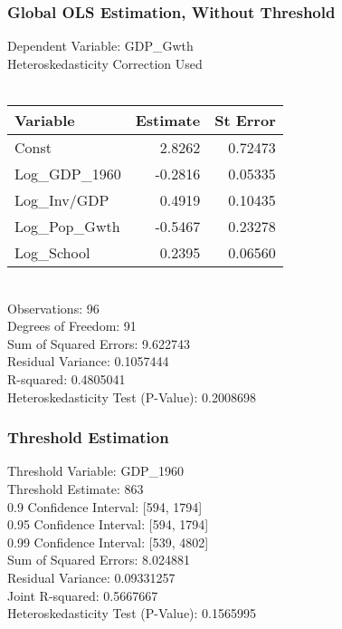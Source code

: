 \subsubsection{Global OLS Estimation, Without Threshold} 
Dependent Variable:      GDP\_Gwth \\
Heteroskedasticity Correction Used \\\\
\begin{tabular}{l*{2}{r}}
\toprule
Variable    &   Estimate     &   St Error \\
\midrule 
Const   &    2.8262   &   0.72473 \\
Log\_GDP\_1960   &   -0.2816   &   0.05335 \\
Log\_Inv/GDP   &    0.4919   &   0.10435 \\
Log\_Pop\_Gwth   &   -0.5467   &   0.23278 \\
Log\_School   &    0.2395   &   0.06560 \\
\bottomrule
\end{tabular}
\bigskip \\
Observations:                       96 \\
Degrees of Freedom:                 91 \\
Sum of Squared Errors:              9.622743 \\
Residual Variance:                  0.1057444 \\
R-squared:                          0.4805041 \\
Heteroskedasticity Test (P-Value):  0.2008698 \\

\subsubsection{Threshold Estimation} 
Threshold Variable:                 GDP\_1960 \\
Threshold Estimate:                 863 \\
0.9 Confidence Interval:           [594, 1794] \\
0.95 Confidence Interval:           [594, 1794] \\
0.99 Confidence Interval:           [539, 4802] \\
Sum of Squared Errors:              8.024881 \\
Residual Variance:                  0.09331257 \\
Joint R-squared:                    0.5667667 \\
Heteroskedasticity Test (P-Value):  0.1565995 \\

